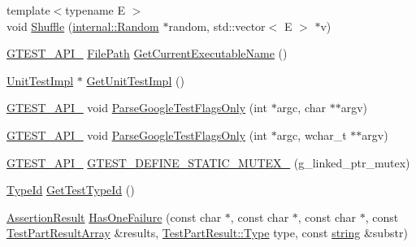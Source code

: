 \begin{DoxyCompactItemize}
\item 
{\footnotesize template$<$typename E $>$ }\\void \hyperlink{namespacetesting_1_1internal_a90d9e6ffe8522a7eb1b2ce9b1a0c4673}{Shuffle} (\hyperlink{classtesting_1_1internal_1_1_random}{internal\-::\-Random} $\ast$random, std\-::vector$<$ E $>$ $\ast$v)
\item 
\hyperlink{gtest-port_8h_aa73be6f0ba4a7456180a94904ce17790}{G\-T\-E\-S\-T\-\_\-\-A\-P\-I\-\_\-} \hyperlink{classtesting_1_1internal_1_1_file_path}{File\-Path} \hyperlink{namespacetesting_1_1internal_a7a2bbf069f75bc99873976ad6fc356ad}{Get\-Current\-Executable\-Name} ()
\item 
\hyperlink{classtesting_1_1internal_1_1_unit_test_impl}{Unit\-Test\-Impl} $\ast$ \hyperlink{namespacetesting_1_1internal_a9bd0caf5d16512de38b39599c13ee634}{Get\-Unit\-Test\-Impl} ()
\item 
\hyperlink{gtest-port_8h_aa73be6f0ba4a7456180a94904ce17790}{G\-T\-E\-S\-T\-\_\-\-A\-P\-I\-\_\-} void \hyperlink{namespacetesting_1_1internal_a472880afbcc592a41e3d623e2dec8412}{Parse\-Google\-Test\-Flags\-Only} (int $\ast$argc, char $\ast$$\ast$argv)
\item 
\hyperlink{gtest-port_8h_aa73be6f0ba4a7456180a94904ce17790}{G\-T\-E\-S\-T\-\_\-\-A\-P\-I\-\_\-} void \hyperlink{namespacetesting_1_1internal_aa3c81a67914856448d0778990d9d9cab}{Parse\-Google\-Test\-Flags\-Only} (int $\ast$argc, wchar\-\_\-t $\ast$$\ast$argv)
\item 
\hyperlink{gtest-port_8h_aa73be6f0ba4a7456180a94904ce17790}{G\-T\-E\-S\-T\-\_\-\-A\-P\-I\-\_\-} \hyperlink{namespacetesting_1_1internal_aff419d76acc3727be48d195f927189c9}{G\-T\-E\-S\-T\-\_\-\-D\-E\-F\-I\-N\-E\-\_\-\-S\-T\-A\-T\-I\-C\-\_\-\-M\-U\-T\-E\-X\-\_\-} (g\-\_\-linked\-\_\-ptr\-\_\-mutex)
\item 
\hyperlink{namespacetesting_1_1internal_a38c435cbab5f8b784e2e7f3356cab242}{Type\-Id} \hyperlink{namespacetesting_1_1internal_ad0d66d56ead224263cd100c1d6bfc562}{Get\-Test\-Type\-Id} ()
\item 
\hyperlink{classtesting_1_1_assertion_result}{Assertion\-Result} \hyperlink{namespacetesting_1_1internal_a14ff02e6d151f45e998657674e9af88a}{Has\-One\-Failure} (const char $\ast$, const char $\ast$, const char $\ast$, const \hyperlink{classtesting_1_1_test_part_result_array}{Test\-Part\-Result\-Array} \&results, \hyperlink{classtesting_1_1_test_part_result_a65ae656b33fdfdfffaf34858778a52d5}{Test\-Part\-Result\-::\-Type} type, const \hyperlink{namespacetesting_1_1internal_a5ca8a348395a6145775c1a2334e21889}{string} \&substr)

\end{DoxyCompactItemize}
